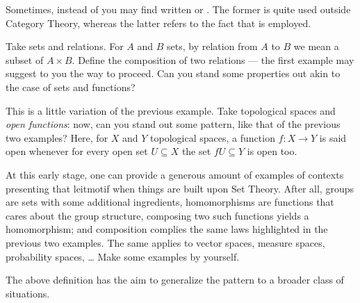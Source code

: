Sometimes, instead of  you may find written  or . The former is quite used outside Category Theory, whereas the latter refers to the fact that \q{\(\to\)} is employed.

\begin{exercise}
Take sets and relations. For \(A\) and \(B\) sets, by relation from \(A\) to \(B\) we mean a subset of \(A \times B\). Define the composition of two relations --- the first example may suggest to you the  way to proceed. Can you stand some properties out akin to the case of sets and functions?
\end{exercise}

\begin{exercise}
This is a little variation of the previous example. Take topological spaces and {\em open functions}: now, can you stand out some pattern, like that of the previous two examples? Here, for \(X\) and \(Y\) topological spaces, a function \(f : X \to Y\) is said open whenever for every open set \(U \subseteq X\) the set \(f U \subseteq Y\) is open too. 
\end{exercise}

\begin{exercise}
At this early stage, one can provide a generous amount of examples of contexts presenting that leitmotif when things are built upon Set Theory. After all, groups are sets with some additional ingredients, homomorphisms are functions that cares about the group structure, composing two such functions yields a homomorphism; and composition complies the same laws highlighted in the previous two examples. The same applies to vector spaces, measure spaces, probability spaces, \dots{} Make some examples by yourself.
\end{exercise}

The above definition has the aim to generalize the  pattern to a broader class of situations.

